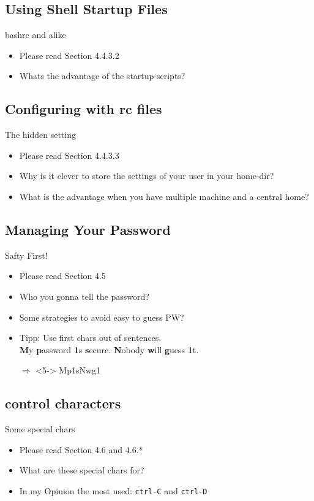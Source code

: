 \documentclass[hyperref={pdfpagelabels=false}]{beamer}
\newcommand{\code}[1]{\colorbox{lGray}{\texttt{#1}}}
\begin{document}
    \subsection{Using Shell Startup Files}
    	\begin{frame}{bashrc and alike}
			\begin{itemize}
				\item<1-> Please read Section 4.4.3.2
                \item<2-> Whats the advantage of the startup-scripts?
            \end{itemize}
		\end{frame}
    \subsection{Configuring with rc files}
    	\begin{frame}{The hidden setting}
			\begin{itemize}
				\item<1-> Please read Section 4.4.3.3
                \item<2-> Why is it clever to store the settings of your user in your home-dir?
                \item<3-> What is the advantage when you have multiple machine and a central home?
            \end{itemize}
		\end{frame}
    \subsection{Managing Your Password}
    	\begin{frame}{Safty First!}
			\begin{itemize}
				\item<1-> Please read Section 4.5
                \item<2-> Who you gonna tell the password?
                \item<3-> Some strategies to avoid easy to guess PW?
                \item<4-> Tipp: Use first chars out of sentences. \\
                 \textbf{M}y \textbf{p}assword \textbf{1}s \textbf{s}ecure. \textbf{N}obody \textbf{w}ill \textbf{g}uess \textbf{1}t.
                \item[$\Rightarrow$]<5-> Mp1sNwg1
            \end{itemize}
		\end{frame}
    \subsection{control characters}
    	\begin{frame}{Some special chars}
			\begin{itemize}
				\item<1-> Please read Section 4.6 and 4.6.*
                \item<2-> What are these special chars for?
                \item<3-> In my Opinion the most used: \code{ctrl-C} and \code{ctrl-D}
            \end{itemize}
		\end{frame}
\end{document}

